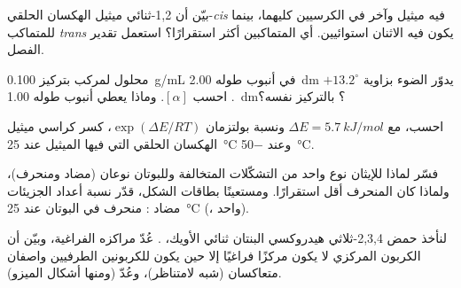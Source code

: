\begin{exercise}[$\star\star$]\label{exo:b1:stereochemistry-in-depth:7}
بيّن أن 1,2-ثنائي ميثيل الهكسان الحلقي-\textit{cis} فيه ميثيل 
وآخر  في الكرسيين كليهما، بينما للمتماكب \textit{trans}
 يكون فيه الاثنان استوائيين. أي المتماكبين أكثر استقرارًا؟ استعمل
تقدير الفصل.
\end{exercise}

\begin{exercise}[$\star\star$]\label{exo:b1:stereochemistry-in-depth:8}
محلول لمركب  بتركيز \qty{0.100}{g/mL} في أنبوب طوله \qty{2.00}{dm}
يدوّر الضوء بزاوية $+13.2^\circ$. احسب $[\alpha]$. وماذا يعطي
أنبوب طوله \qty{1.00}{dm}؟  بالتركيز نفسه؟
\end{exercise}

\begin{exercise}[$\star\star$]\label{exo:b1:stereochemistry-in-depth:9}
احسب، مع $\Delta E = \qty{5.7}{kJ/mol}$ ونسبة بولتزمان
$\exp(\Delta E/RT)$، كسر كراسي ميثيل الهكسان الحلقي التي فيها
الميثيل  عند \qty{25}{\celsius} وعند \qty{-50}{\celsius}.
\end{exercise}

\begin{exercise}[$\star\star\star$]\label{exo:b1:stereochemistry-in-depth:10}
فسّر لماذا للإيثان نوع واحد من التشكّلات المتخالفة
وللبوتان نوعان (مضاد ومنحرف)، ولماذا كان المنحرف أقل استقرارًا. ومستعينًا
بطاقات الشكل، قدّر نسبة أعداد الجزيئات مضاد : منحرف في
البوتان عند \qty{25}{\celsius} (،  واحد).
\end{exercise}

\begin{exercise}[$\star\star\star$]\label{exo:b1:stereochemistry-in-depth:11}
لنأخذ حمض 2,3,4-ثلاثي هيدروكسي البنتان ثنائي الأويك،
. عُدّ مراكزه الفراغية، وبيّن
أن الكربون المركزي لا يكون مركزًا فراغيًا إلا حين يكون للكربونين الطرفيين
واصفان متعاكسان (شبه لامتناظر)، وعُدّ 
(ومنها أشكال الميزو).
\end{exercise}

